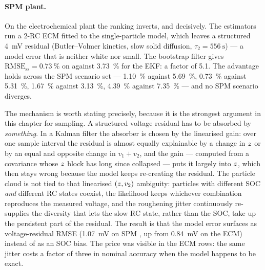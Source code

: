 \paragraph{SPM plant.}  On the electrochemical plant the ranking inverts, and decisively.  The
estimators run a 2-RC ECM fitted to the single-particle model, which leaves a structured
\SI{4}{\milli\volt} residual (Butler--Volmer kinetics, slow solid diffusion, $\tau_2 =
\SI{556}{\second}$) --- a model error that is neither white nor small.  The bootstrap filter gives
$\mathrm{RMSE}_{\mathrm{ss}} = \SI{0.73}{\percent}$ on  against \SI{3.73}{\percent}
for the EKF: a factor of \num{5.1}.  The advantage holds across the SPM scenario set ---
 \SI{1.10}{\percent} against \SI{5.69}{\percent}, 
\SI{0.73}{\percent} against \SI{5.31}{\percent},  \SI{1.67}{\percent} against
\SI{3.13}{\percent},  \SI{4.39}{\percent} against \SI{7.35}{\percent} --- and no SPM
scenario diverges.

The mechanism is worth stating precisely, because it is the strongest argument in this chapter for
sampling.  A structured voltage residual has to be absorbed by \emph{something}.  In a Kalman
filter the absorber is chosen by the linearised gain: over one sample interval the residual is
almost equally explainable by a change in $z$ or by an equal and opposite change in $v_1+v_2$,
and the gain --- computed from a covariance whose $z$ block has long since collapsed --- puts it
largely into $z$, which then stays wrong because the model keeps re-creating the residual.  The
particle cloud is not tied to that linearised $(z, v_2)$ ambiguity: particles with different
SOC \emph{and} different RC states coexist, the likelihood keeps whichever combination reproduces
the measured voltage, and the roughening jitter continuously re-supplies the diversity that lets
the slow RC state, rather than the SOC, take up the persistent part of the residual.  The result is
that the model error surfaces as voltage-residual RMSE (\SI{1.07}{\milli\volt} on SPM
, up from \SI{0.84}{\milli\volt} on the ECM) instead of as an SOC bias.  The price
was visible in the ECM rows: the same jitter costs a factor of three in nominal accuracy when the
model happens to be exact.

